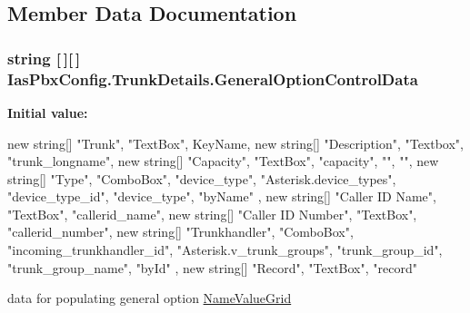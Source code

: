 \subsection{Member Data Documentation}
\hypertarget{class_ias_pbx_config_1_1_trunk_details_a866767d2389bed7020f9f50ffcab120b}{
\subsubsection[{GeneralOptionControlData}]{\setlength{\rightskip}{0pt plus 5cm}string \mbox{[}$\,$\mbox{]}\mbox{[}$\,$\mbox{]} {\bf IasPbxConfig.TrunkDetails.GeneralOptionControlData}}}
\label{class_ias_pbx_config_1_1_trunk_details_a866767d2389bed7020f9f50ffcab120b}
{\bfseries Initial value:}
\begin{DoxyCode}
 
        {
            
            new string[] {"Trunk", "TextBox", KeyName},
            new string[] {"Description", "Textbox", "trunk_longname"},
            new string[] {"Capacity", "TextBox", "capacity", "", ""},
            new string[] {
                "Type", 
                "ComboBox", 
                "device_type", 
                "Asterisk.device_types", 
                "device_type_id", 
                "device_type",
                "byName" 
            },
            new string[] {"Caller ID Name", "TextBox", "callerid_name"},
            new string[] {"Caller ID Number", "TextBox", "callerid_number"},
            new string[] {
                "Trunkhandler", 
                "ComboBox", 
                "incoming_trunkhandler_id", 
                "Asterisk.v_trunk_groups", 
                "trunk_group_id", 
                "trunk_group_name",
                "byId"
            },
            new string[] {"Record", "TextBox", "record"}
        }
\end{DoxyCode}


data for populating general option \hyperlink{class_ias_pbx_config_1_1_name_value_grid}{NameValueGrid} 


